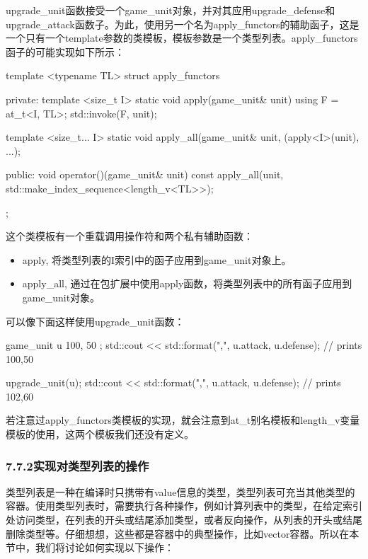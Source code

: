 upgrade\_unit函数接受一个game\_unit对象，并对其应用upgrade\_defense和upgrade\_attack函数子。为此，使用另一个名为apply\_functors的辅助函子，这是一个只有一个template参数的类模板，模板参数是一个类型列表。apply\_functors函子的可能实现如下所示：

\begin{cpp}
template <typename TL>
struct apply_functors
{
private:
	template <size_t I>
	static void apply(game_unit& unit)
	{
		using F = at_t<I, TL>;
		std::invoke(F{}, unit);
	}

	template <size_t... I>
	static void apply_all(game_unit& unit,
	{
		(apply<I>(unit), ...);
	}

public:
	void operator()(game_unit& unit) const
	{
		apply_all(unit,
		std::make_index_sequence<length_v<TL>>{});
	}
};
\end{cpp}

这个类模板有一个重载调用操作符和两个私有辅助函数：

\begin{itemize}
\item
apply, 将类型列表的I索引中的函子应用到game\_unit对象上。

\item
apply\_all, 通过在包扩展中使用apply函数，将类型列表中的所有函子应用到game\_unit对象。
\end{itemize}

可以像下面这样使用upgrade\_unit函数：

\begin{cpp}
game_unit u{ 100, 50 };
std::cout << std::format("{},{}\n", u.attack, u.defense);
// prints 100,50

upgrade_unit(u);
std::cout << std::format("{},{}\n", u.attack, u.defense);
// prints 102,60
\end{cpp}

若注意过apply\_functors类模板的实现，就会注意到at\_t别名模板和length\_v变量模板的使用，这两个模板我们还没有定义。

\subsubsection{7.7.2\hspace{0.2cm}实现对类型列表的操作}

类型列表是一种在编译时只携带有value信息的类型，类型列表可充当其他类型的容器。使用类型列表时，需要执行各种操作，例如计算列表中的类型，在给定索引处访问类型，在列表的开头或结尾添加类型，或者反向操作，从列表的开头或结尾删除类型等。仔细想想，这些都是容器中的典型操作，比如vector容器。所以在本节中，我们将讨论如何实现以下操作：

